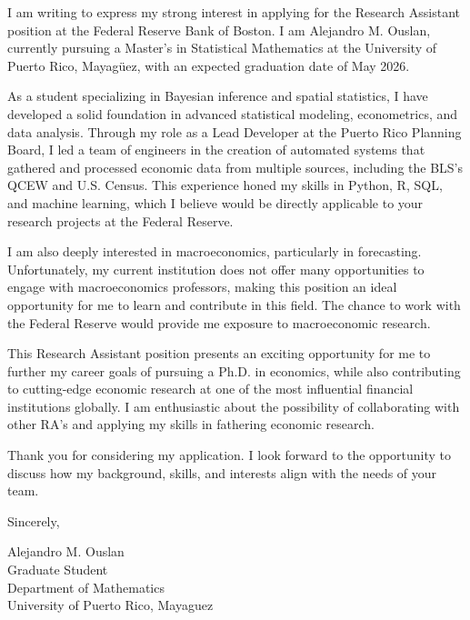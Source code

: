 \documentclass{article}
\begin{document}
I am writing to express my strong interest in applying for the Research Assistant position at the Federal Reserve Bank of Boston.
I am Alejandro M. Ouslan, currently pursuing a Master’s in Statistical Mathematics at the University of Puerto Rico, Mayagüez, with an expected graduation date of May 2026.

As a student specializing in Bayesian inference and spatial statistics, I have developed a solid foundation in advanced statistical modeling, econometrics, and data analysis.
Through my role as a Lead Developer at the Puerto Rico Planning Board, I led a team of engineers in the creation of automated systems that gathered and processed economic data
from multiple sources, including the BLS’s QCEW and U.S. Census. This experience honed my skills in Python, R, SQL, and machine learning, which I believe would be directly
applicable to your research projects at the Federal Reserve.

I am also deeply interested in macroeconomics, particularly in forecasting. Unfortunately, my current institution does not offer many opportunities to engage with macroeconomics professors,
making this position an ideal opportunity for me to learn and contribute in this field. The chance to work with the Federal Reserve would provide me exposure to macroeconomic
research.

This Research Assistant position presents an exciting opportunity for me to further my career goals of pursuing a Ph.D. in economics, while also contributing to
cutting-edge economic research at one of the most influential financial institutions globally. I am enthusiastic about the possibility of collaborating with
other RA's and applying my skills in fathering economic research.

Thank you for considering my application. I look forward to the opportunity to discuss how my background, skills, and interests align with the needs of your team.

Sincerely,  
\vspace{20pt}  

Alejandro M. Ouslan \\
Graduate Student \\
Department of Mathematics \\
University of Puerto Rico, Mayaguez
\end{document}
